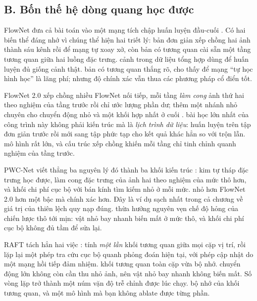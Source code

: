 \documentclass[../../deep_learning.tex]{subfiles}
\begin{document}
\subsection{B. Bốn thế hệ dòng quang học được}
\begin{mach}
\item {}
\gp FlowNet đưa cả bài toán vào một mạng tích chập huấn luyện đầu-cuối \cite{dosovitskiy2015flownet}. Có hai biến thể đáng nhớ vì chúng thể hiện hai triết lý: bản đơn giản xếp chồng hai ảnh thành sáu kênh rồi để mạng tự xoay xở, còn bản có tương quan cài sẵn một tầng tương quan giữa hai luồng đặc trưng.
\gd cảnh trong dữ liệu tổng hợp dùng để huấn luyện đủ giống cảnh thật.
\vdm bản có tương quan thắng rõ, cho thấy để mạng ``tự học hình học'' là lãng phí; nhưng độ chính xác vẫn thua các phương pháp cổ điển tốt.

\item {}
\gp FlowNet 2.0 xếp chồng nhiều FlowNet nối tiếp, mỗi tầng \emph{làm cong} ảnh thứ hai theo nghiệm của tầng trước rồi chỉ ước lượng phần dư; thêm một nhánh nhỏ chuyên cho chuyển động nhỏ và một khối hợp nhất ở cuối \cite{ilg2017flownet2}.
\hq bài học lớn nhất của công trình này không phải kiến trúc mà là \emph{lịch trình dữ liệu}: huấn luyện trên tập đơn giản trước rồi mới sang tập phức tạp cho kết quả khác hẳn so với trộn lẫn.
\gia mô hình rất lớn, và cấu trúc xếp chồng khiến mỗi tầng chỉ tinh chỉnh quanh nghiệm của tầng trước.

\item {}
\gp PWC-Net viết thẳng ba nguyên lý đó thành ba khối kiến trúc \cite{sun2018pwcnet}: kim tự tháp đặc trưng học được, làm cong đặc trưng của ảnh hai theo nghiệm của mức thô hơn, và khối chi phí cục bộ với bán kính tìm kiếm nhỏ ở mỗi mức.
\hq nhỏ hơn FlowNet 2.0 hơn một bậc mà chính xác hơn. Đây là ví dụ sạch nhất trong cả chương về giá trị của thiên lệch quy nạp đúng.
\gia thừa hưởng nguyên vẹn chế độ hỏng của chiến lược thô tới mịn: vật nhỏ bay nhanh biến mất ở mức thô, và khối chi phí cục bộ không đủ tầm để sửa lại.

\item {}
\gp RAFT tách hẳn hai việc \cite{teed2020raft}: tính \emph{một lần} khối tương quan giữa mọi cặp vị trí, rồi lặp lại một phép tra cứu cục bộ quanh phỏng đoán hiện tại, với phép cập nhật do một mạng hồi tiếp đảm nhiệm.
\gd khối tương quan toàn cặp vừa bộ nhớ.
\hq chuyển động lớn không còn cần thu nhỏ ảnh, nên vật nhỏ bay nhanh không biến mất. Số vòng lặp trở thành một núm vặn độ trễ chỉnh được lúc chạy.
\gia bộ nhớ của khối tương quan, và một mô hình mà bạn không ablate được từng phần.


\end{mach}
\end{document}
